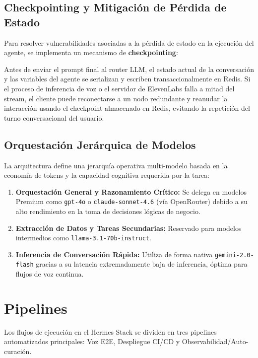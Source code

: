 \documentclass[12pt,a4paper,openany]{book}
\newcommand{\code}[1]{\texttt{\small#1}}
\begin{document}
\section{Checkpointing y Mitigación de Pérdida de Estado}
Para resolver vulnerabilidades asociadas a la pérdida de estado en la ejecución del agente, se implementa un mecanismo de \textbf{checkpointing}:
\begin{infobox}
Antes de enviar el prompt final al router LLM, el estado actual de la conversación y las variables del agente se serializan y escriben transaccionalmente en Redis. Si el proceso de inferencia de voz o el servidor de ElevenLabs falla a mitad del stream, el cliente puede reconectarse a un nodo redundante y reanudar la interacción usando el checkpoint almacenado en Redis, evitando la repetición del turno conversacional del usuario.
\end{infobox}

\section{Orquestación Jerárquica de Modelos}
La arquitectura define una jerarquía operativa multi-modelo basada en la economía de tokens y la capacidad cognitiva requerida por la tarea:
\begin{enumerate}
    \item \textbf{Orquestación General y Razonamiento Crítico:} Se delega en modelos Premium como \code{gpt-4o} o \code{claude-sonnet-4.6} (vía OpenRouter) debido a su alto rendimiento en la toma de decisiones lógicas de negocio.
    \item \textbf{Extracción de Datos y Tareas Secundarias:} Reservado para modelos intermedios como \code{llama-3.1-70b-instruct}.
    \item \textbf{Inferencia de Conversación Rápida:} Utiliza de forma nativa \code{gemini-2.0-flash} gracias a su latencia extremadamente baja de inferencia, óptima para flujos de voz continua.
\end{enumerate}

\chapter{Pipelines}
Los flujos de ejecución en el Hermes Stack se dividen en tres pipelines automatizados principales: Voz E2E, Despliegue CI/CD y Observabilidad/Auto-curación.
\end{document}
